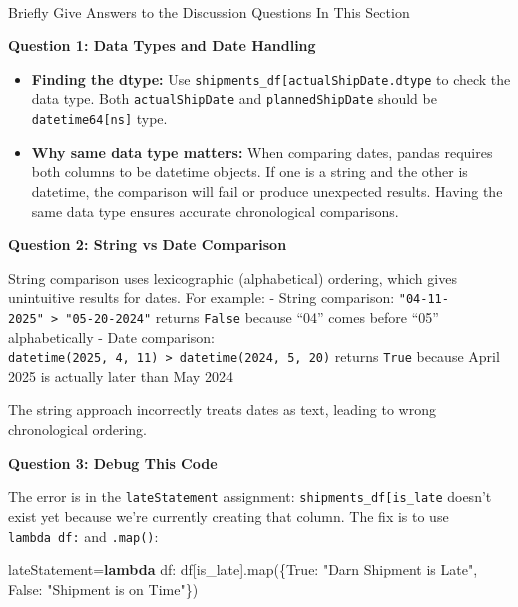 \documentclass[
  letterpaper,
  DIV=11,
  numbers=noendperiod]{scrartcl}
\makeatletter
\let\oldparagraph\paragraph
\renewcommand{\paragraph}{
    \@ifstar
      \xxxParagraphStar
      \xxxParagraphNoStar
  }
\newcommand{\xxxParagraphStar}[1]{\oldparagraph*{#1}\mbox{}}
\newcommand{\xxxParagraphNoStar}[1]{\oldparagraph{#1}\mbox{}}
\newenvironment{Shaded}{\begin{snugshade}}{\end{snugshade}}
\newcommand{\BuiltInTok}[1]{\textcolor[rgb]{0.00,0.23,0.31}{#1}}
\newcommand{\KeywordTok}[1]{\textcolor[rgb]{0.00,0.23,0.31}{\textbf{#1}}}
\newcommand{\NormalTok}[1]{\textcolor[rgb]{0.00,0.23,0.31}{#1}}
\newcommand{\OperatorTok}[1]{\textcolor[rgb]{0.37,0.37,0.37}{#1}}
\newcommand{\StringTok}[1]{\textcolor[rgb]{0.13,0.47,0.30}{#1}}
\newcommand{\VariableTok}[1]{\textcolor[rgb]{0.07,0.07,0.07}{#1}}
\providecommand{\tightlist}{%
  \setlength{\itemsep}{0pt}\setlength{\parskip}{0pt}}
\makeatother
\begin{document}
\paragraph{Briefly Give Answers to the Discussion Questions In This
Section}\label{briefly-give-answers-to-the-discussion-questions-in-this-section}

\textbf{Question 1: Data Types and Date Handling}

\begin{itemize}
\tightlist
\item
  \textbf{Finding the dtype:} Use
  \texttt{shipments\_df{[}\textquotesingle{}actualShipDate\textquotesingle{}{]}.dtype}
  to check the data type. Both \texttt{actualShipDate} and
  \texttt{plannedShipDate} should be \texttt{datetime64{[}ns{]}} type.
\item
  \textbf{Why same data type matters:} When comparing dates, pandas
  requires both columns to be datetime objects. If one is a string and
  the other is datetime, the comparison will fail or produce unexpected
  results. Having the same data type ensures accurate chronological
  comparisons.
\end{itemize}

\textbf{Question 2: String vs Date Comparison}

String comparison uses lexicographic (alphabetical) ordering, which
gives unintuitive results for dates. For example: - String comparison:
\texttt{"04-11-2025"\ \textgreater{}\ "05-20-2024"} returns
\texttt{False} because ``04'' comes before ``05'' alphabetically - Date
comparison:
\texttt{datetime(2025,\ 4,\ 11)\ \textgreater{}\ datetime(2024,\ 5,\ 20)}
returns \texttt{True} because April 2025 is actually later than May 2024

The string approach incorrectly treats dates as text, leading to wrong
chronological ordering.

\textbf{Question 3: Debug This Code}

The error is in the \texttt{lateStatement} assignment:
\texttt{shipments\_df{[}\textquotesingle{}is\_late\textquotesingle{}{]}}
doesn't exist yet because we're currently creating that column. The fix
is to use \texttt{lambda\ df:} and \texttt{.map()}:

\begin{Shaded}
\begin{Highlighting}[]
\NormalTok{lateStatement}\OperatorTok{=}\KeywordTok{lambda}\NormalTok{ df: df[}\StringTok{\textquotesingle{}is\_late\textquotesingle{}}\NormalTok{].}\BuiltInTok{map}\NormalTok{(\{}\VariableTok{True}\NormalTok{: }\StringTok{"Darn Shipment is Late"}\NormalTok{, }\VariableTok{False}\NormalTok{: }\StringTok{"Shipment is on Time"}\NormalTok{\})}
\end{Highlighting}
\end{Shaded}
\end{document}
